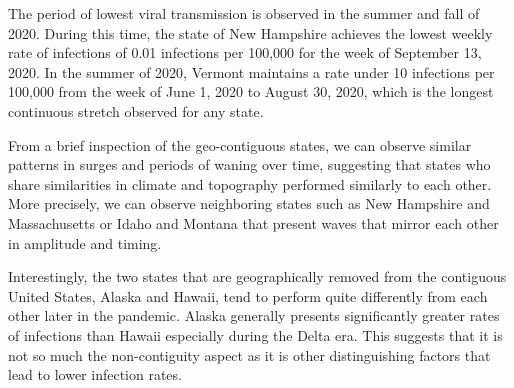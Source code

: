 The period of lowest viral transmission is observed in the summer and fall of
2020. During this time, the state of New Hampshire achieves the lowest weekly
rate of infections of 0.01 infections per 100,000 for the week of September 13,
2020. In the summer of 2020, Vermont maintains a rate under 10 infections per
100,000 from the week of June 1, 2020 to August 30, 2020, which is the longest
continuous stretch observed for any state.

From a brief inspection of the geo-contiguous states, we can observe similar
patterns in surges and periods of waning over time, suggesting that states who
share similarities in climate and topography performed similarly to each other.
More precisely, we can observe neighboring states such as New Hampshire and
Massachusetts or Idaho and Montana that present waves that mirror each other in
amplitude and timing. 

Interestingly, the two states that are geographically removed from the
contiguous United States, Alaska and Hawaii, tend to perform quite differently
from each other later in the pandemic. Alaska generally presents significantly
greater rates of infections than Hawaii especially during the Delta era. This
suggests that it is not so much the non-contiguity aspect as it is other
distinguishing factors that lead to lower infection rates.


